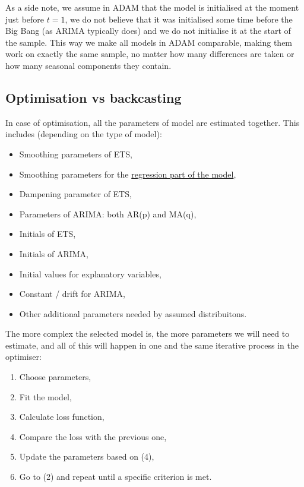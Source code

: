 \documentclass[
]{book}
\providecommand{\tightlist}{%
  \setlength{\itemsep}{0pt}\setlength{\parskip}{0pt}}
\theoremstyle{definition}
\theoremstyle{definition}
\theoremstyle{definition}
\theoremstyle{definition}
\theoremstyle{remark}
\begin{document}
As a side note, we assume in ADAM that the model is initialised at the moment just before \(t=1\), we do not believe that it was initialised some time before the Big Bang (as ARIMA typically does) and we do not initialise it at the start of the sample. This way we make all models in ADAM comparable, making them work on exactly the same sample, no matter how many differences are taken or how many seasonal components they contain.

\hypertarget{ADAMInitialisationOptAndBack}{%
\subsection{Optimisation vs backcasting}\label{ADAMInitialisationOptAndBack}}

In case of optimisation, all the parameters of model are estimated together. This includes (depending on the type of model):

\begin{itemize}
\tightlist
\item
  Smoothing parameters of ETS,
\item
  Smoothing parameters for the \protect\hyperlink{ETSXDynamic}{regression part of the model},
\item
  Dampening parameter of ETS,
\item
  Parameters of ARIMA: both AR(p) and MA(q),
\item
  Initials of ETS,
\item
  Initials of ARIMA,
\item
  Initial values for explanatory variables,
\item
  Constant / drift for ARIMA,
\item
  Other additional parameters needed by assumed distribuitons.
\end{itemize}

The more complex the selected model is, the more parameters we will need to estimate, and all of this will happen in one and the same iterative process in the optimiser:

\begin{enumerate}
\def\labelenumi{\arabic{enumi}.}
\tightlist
\item
  Choose parameters,
\item
  Fit the model,
\item
  Calculate loss function,
\item
  Compare the loss with the previous one,
\item
  Update the parameters based on (4),
\item
  Go to (2) and repeat until a specific criterion is met.
\end{enumerate}
\end{document}
